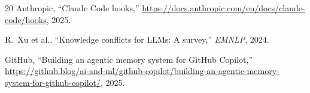 \documentclass[11pt,a4paper]{article}
\begin{document}
\begin{thebibliography}{20}
Anthropic,
``Claude Code hooks,''
\url{https://docs.anthropic.com/en/docs/claude-code/hooks}, 2025.

R.~Xu et al.,
``Knowledge conflicts for LLMs: A survey,''
\emph{EMNLP}, 2024.

GitHub,
``Building an agentic memory system for GitHub Copilot,''
\url{https://github.blog/ai-and-ml/github-copilot/building-an-agentic-memory-system-for-github-copilot/}, 2025.

\end{thebibliography}
\end{document}
